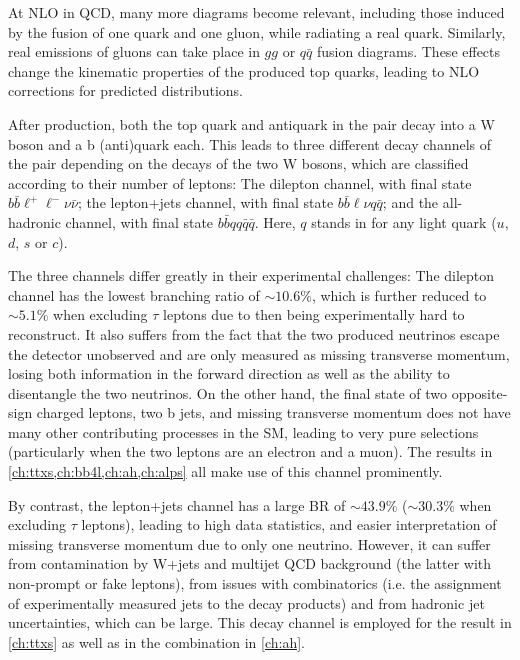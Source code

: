 At NLO in QCD, many more diagrams become relevant, including those induced by the fusion of one quark and one gluon, while radiating a real quark. Similarly, real emissions of gluons can take place in $gg$ or $q\bar{q}$ fusion diagrams. These effects change the kinematic properties of the produced top quarks, leading to NLO corrections for predicted distributions.

After production, both the top quark and antiquark in the \ttbar pair decay into a W boson and a b (anti)quark each. This leads to three different decay channels of the \ttbar pair depending on the decays of the two W bosons, which are classified according to their number of leptons: The dilepton channel, with final state $b \bar{b} \ell^+ \ell^- \nu \bar{\nu}$; the lepton+jets channel, with final state $b \bar{b} \ell \nu q \bar{q}$; and the all-hadronic channel, with final state $b \bar{b} q q \bar{q} \bar{q}$. Here, $q$ stands in for any light quark ($u$, $d$, $s$ or $c$).

The three channels differ greatly in their experimental challenges: The dilepton channel has the lowest branching ratio of $\sim 10.6\%$, which is further reduced to $\sim 5.1\%$ when excluding $\tau$ leptons due to then being experimentally hard to reconstruct. It also suffers from the fact that the two produced neutrinos escape the detector unobserved and are only measured as missing transverse momentum, losing both information in the forward direction as well as the ability to disentangle the two neutrinos. On the other hand, the final state of two opposite-sign charged leptons, two b jets, and missing transverse momentum does not have many other contributing processes in the SM, leading to very pure selections (particularly when the two leptons are an electron and a muon). The results in \cref{ch:ttxs,ch:bb4l,ch:ah,ch:alps} all make use of this channel prominently.

By contrast, the lepton+jets channel has a large BR of $\sim 43.9\%$ ($\sim 30.3\%$ when excluding $\tau$ leptons), leading to high data statistics, and easier interpretation of missing transverse momentum due to only one neutrino. However, it can suffer from contamination by W+jets and multijet QCD background (the latter with non-prompt or fake leptons), from issues with combinatorics (i.e. the assignment of experimentally measured jets to the decay products) and from hadronic jet uncertainties, which can be large. This decay channel is employed for the result in \cref{ch:ttxs} as well as in the combination in \cref{ch:ah}.

